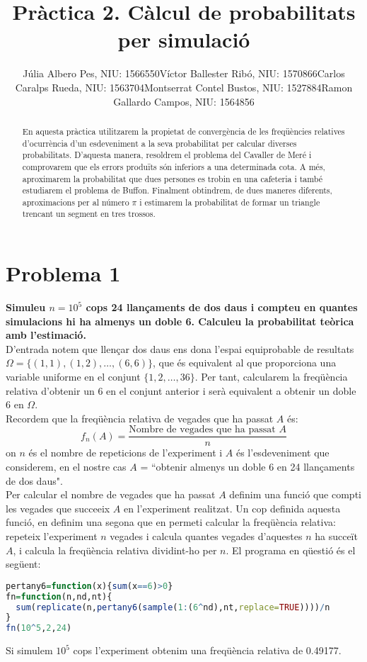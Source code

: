 \documentclass[11pt,a4paper]{article}
\title{\bfseries\Large Pràctica 2. Càlcul de probabilitats per simulació}
\author{Júlia Albero Pes, NIU: 1566550\endgraf Víctor Ballester Ribó, NIU: 1570866\endgraf Carlos Caralps Rueda, NIU: 1563704\endgraf Montserrat Contel Bustos, NIU: 1527884\endgraf Ramon Gallardo Campos, NIU: 1564856}
\date{\parbox{\linewidth}{\centering
  Probabilitat i Modelització Estocàstica\endgraf
  Grau en Matemàtiques\endgraf
  Universitat Autònoma de Barcelona\endgraf
  Desembre de 2021}}
\begin{document}
\maketitle
\begin{abstract}
  \noindent En aquesta pràctica utilitzarem la propietat de convergència de les freqüències relatives d’ocurrència d'un esdeveniment a la seva probabilitat per calcular diverses probabilitats.
  D'aquesta manera, resoldrem el problema del Cavaller de Meré i comprovarem que els errors produïts són inferiors a una determinada cota. A més, aproximarem la probabilitat que dues persones es trobin en una cafeteria i també estudiarem el problema de Buffon. Finalment obtindrem, de dues maneres diferents, aproximacions per al número $\pi$ i estimarem la probabilitat de formar un triangle trencant un segment en tres trossos.
\end{abstract}
\thispagestyle{empty}
\newpage
\setcounter{page}{1}
\restoregeometry
\newpage

\section*{Problema 1}
\textbf{Simuleu $n=10^5$ cops 24 llançaments de dos daus i compteu en quantes simulacions hi ha almenys un doble 6. Calculeu la probabilitat teòrica amb l'estimació.}\\
D'entrada notem que llençar dos daus ens dona l'espai equiprobable de resultats $\Omega=\{(1,1),(1,2),\ldots,(6,6)\}$, que és equivalent al que proporciona una variable uniforme en el conjunt $\{1,2,\ldots,36\}$. Per tant, calcularem la freqüència relativa d'obtenir un 6 en el conjunt anterior i serà equivalent a obtenir un doble 6 en $\Omega$.\\
Recordem que la freqüència relativa de vegades que ha passat $A$ és:
$$f_n(A)=\frac{\text{Nombre de vegades que ha passat $A$}}{n}$$
on $n$ és el nombre de repeticions de l'experiment i $A$ és l'esdeveniment que considerem, en el nostre cas $A$ = ``obtenir almenys un doble 6 en 24 llançaments de dos daus".\\
Per calcular el nombre de vegades que ha passat $A$ definim una funció que compti les vegades que succeeix $A$ en l'experiment realitzat. Un cop definida aquesta funció, en definim una segona que en permeti calcular la freqüència relativa: repeteix l'experiment $n$ vegades i calcula quantes vegades d'aquestes $n$ ha succeït $A$, i calcula la freqüència relativa dividint-ho per $n$.
El programa en qüestió és el següent:
\begin{lstlisting}[language=R, caption={Programa del problema 1, on nd és el número de daus i nt és el número de tirades},xleftmargin=.08\textwidth,xrightmargin=.08\textwidth]
pertany6=function(x){sum(x==6)>0}
fn=function(n,nd,nt){
  sum(replicate(n,pertany6(sample(1:(6^nd),nt,replace=TRUE))))/n
}
fn(10^5,2,24)
\end{lstlisting}
Si simulem $10^5$ cops l'experiment obtenim una freqüència relativa de 0.49177.
\end{document}
